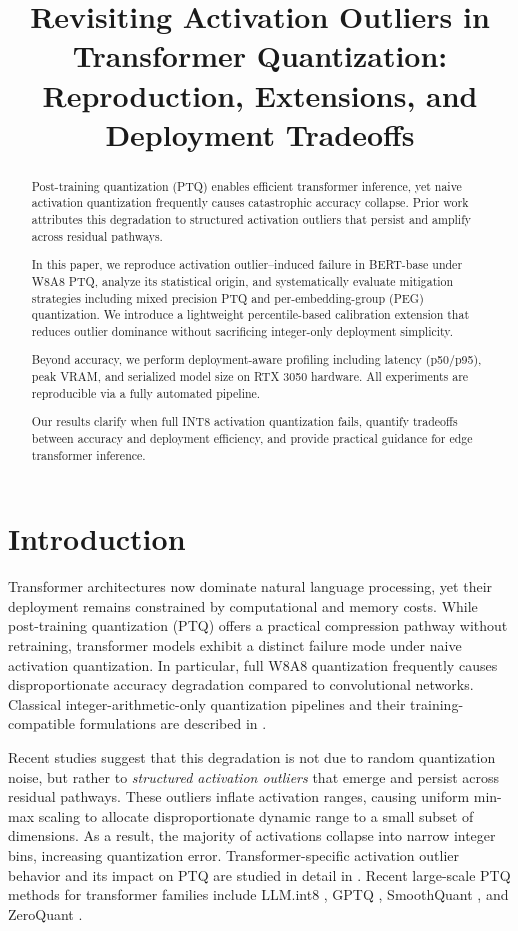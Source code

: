 \documentclass[conference]{IEEEtran}
\title{Revisiting Activation Outliers in Transformer Quantization:\\
Reproduction, Extensions, and Deployment Tradeoffs}
\author{
\IEEEauthorblockN{Pranav Kumar Kaliaperumal}
\IEEEauthorblockA{
M.S. Computer Science\\
University of Colorado Denver\\
Aurora, Colorado, USA\\
\href{mailto:pranavkumar.kaliaperumal@ucdenver.edu}{pranavkumar.kaliaperumal@ucdenver.edu}
}
}
\begin{document}
\maketitle

\begin{abstract}
Post-training quantization (PTQ) enables efficient transformer inference, yet naive activation quantization frequently causes catastrophic accuracy collapse. Prior work attributes this degradation to structured activation outliers that persist and amplify across residual pathways. 

In this paper, we reproduce activation outlier–induced failure in BERT-base under W8A8 PTQ, analyze its statistical origin, and systematically evaluate mitigation strategies including mixed precision PTQ and per-embedding-group (PEG) quantization. We introduce a lightweight percentile-based calibration extension that reduces outlier dominance without sacrificing integer-only deployment simplicity.

Beyond accuracy, we perform deployment-aware profiling including latency (p50/p95), peak VRAM, and serialized model size on RTX 3050 hardware. All experiments are reproducible via a fully automated pipeline.

Our results clarify when full INT8 activation quantization fails, quantify tradeoffs between accuracy and deployment efficiency, and provide practical guidance for edge transformer inference.
\end{abstract}

\section{Introduction}

Transformer architectures now dominate natural language processing, yet their deployment remains constrained by computational and memory costs. While post-training quantization (PTQ) offers a practical compression pathway without retraining, transformer models exhibit a distinct failure mode under naive activation quantization. In particular, full W8A8 quantization frequently causes disproportionate accuracy degradation compared to convolutional networks. Classical integer-arithmetic-only quantization pipelines and their training-compatible formulations are described in \cite{jacob2018quantization}.

Recent studies suggest that this degradation is not due to random quantization noise, but rather to \emph{structured activation outliers} that emerge and persist across residual pathways. These outliers inflate activation ranges, causing uniform min-max scaling to allocate disproportionate dynamic range to a small subset of dimensions. As a result, the majority of activations collapse into narrow integer bins, increasing quantization error. Transformer-specific activation outlier behavior and its impact on PTQ are studied in detail in \cite{bondarenko2021understanding}. Recent large-scale PTQ methods for transformer families include LLM.int8 \cite{dettmers2022llmint8}, GPTQ \cite{frantar2022gptq}, SmoothQuant \cite{xiao2023smoothquant}, and ZeroQuant \cite{yao2022zeroquant}.
\end{document}
